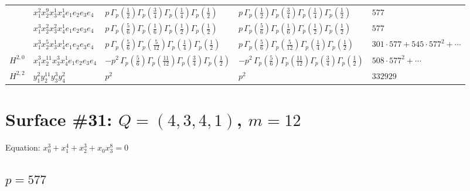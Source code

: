 \documentclass[11pt]{article}
\begin{document}
\begin{table}[ht]
{\begin{tabular}{@{}lllll@{}}
 & $x_{1}^{2} x_{2}^{9} x_{3}^{1} x_{4}^{1}  e_{1} e_{2} e_{3} e_{4}$ & $p \, \Gamma_p \left( \frac{1}{2} \right) \Gamma_p \left( \frac{3}{4} \right) \Gamma_p \left( \frac{1}{4} \right) \Gamma_p \left( \frac{1}{2} \right)$ & $p \, \Gamma_p \left( \frac{1}{2} \right) \Gamma_p \left( \frac{3}{4} \right) \Gamma_p \left( \frac{1}{4} \right) \Gamma_p \left( \frac{1}{2} \right)$ & $577$ \\
 & $x_{1}^{3} x_{2}^{2} x_{3}^{2} x_{4}^{1}  e_{1} e_{2} e_{3} e_{4}$ & $p \, \Gamma_p \left( \frac{5}{6} \right) \Gamma_p \left( \frac{1}{6} \right) \Gamma_p \left( \frac{1}{2} \right) \Gamma_p \left( \frac{1}{2} \right)$ & $p \, \Gamma_p \left( \frac{5}{6} \right) \Gamma_p \left( \frac{1}{6} \right) \Gamma_p \left( \frac{1}{2} \right) \Gamma_p \left( \frac{1}{2} \right)$ & $577$ \\
 & $x_{1}^{3} x_{2}^{5} x_{3}^{1} x_{4}^{1}  e_{1} e_{2} e_{3} e_{4}$ & $p \, \Gamma_p \left( \frac{5}{6} \right) \Gamma_p \left( \frac{5}{12} \right) \Gamma_p \left( \frac{1}{4} \right) \Gamma_p \left( \frac{1}{2} \right)$ & $p \, \Gamma_p \left( \frac{5}{6} \right) \Gamma_p \left( \frac{5}{12} \right) \Gamma_p \left( \frac{1}{4} \right) \Gamma_p \left( \frac{1}{2} \right)$ & $301{\cdot}577{+}545{\cdot}577^{2}{+}\cdots$ \\
\midrule
$H^{2,0}$ & $x_{1}^{3} x_{2}^{11} x_{3}^{3} x_{4}^{1}  e_{1} e_{2} e_{3} e_{4}$ & $- p^{2} \, \Gamma_p \left( \frac{5}{6} \right) \Gamma_p \left( \frac{11}{12} \right) \Gamma_p \left( \frac{3}{4} \right) \Gamma_p \left( \frac{1}{2} \right)$ & $- p^{2} \, \Gamma_p \left( \frac{5}{6} \right) \Gamma_p \left( \frac{11}{12} \right) \Gamma_p \left( \frac{3}{4} \right) \Gamma_p \left( \frac{1}{2} \right)$ & $508{\cdot}577^{2}{+}\cdots$ \\
\midrule
$H^{2,2}$ & $y_{1}^{2} y_{2}^{11} y_{3}^{3} y_{4}^{2}$ & $p^{2} \,$ & $p^{2} \,$ & $332929$ \\
\bottomrule
\end{tabular}
}
\renewcommand{\arraystretch}{1.0}
\end{table}

\newpage

\section*{Surface \#31: $Q=(4, 3, 4, 1)$, $m=12$}

Equation: $x_0^{3} + x_1^{4} + x_2^{3} + x_0 x_3^{8} = 0$

\subsection*{$p = 577$}
\end{document}
